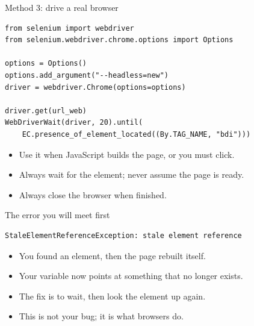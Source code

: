 \documentclass[11pt,aspectratio=169]{beamer}
\newenvironment{wideitemize}
  {\begin{itemize}\setlength{\itemsep}{10pt}}
  {\end{itemize}}
\begin{document}
\begin{frame}[fragile]{Method 3: drive a real browser}
\begin{lstlisting}[style=py]
from selenium import webdriver
from selenium.webdriver.chrome.options import Options

options = Options()
options.add_argument("--headless=new")
driver = webdriver.Chrome(options=options)

driver.get(url_web)
WebDriverWait(driver, 20).until(
    EC.presence_of_element_located((By.TAG_NAME, "bdi")))
\end{lstlisting}

\begin{wideitemize}
  \item Use it when JavaScript builds the page, or you must click.
  \item Always wait for the element; never assume the page is ready.
  \item Always close the browser when finished.
\end{wideitemize}
\end{frame}

\begin{frame}[fragile]{The error you will meet first}
\begin{lstlisting}[style=code]
StaleElementReferenceException: stale element reference
\end{lstlisting}

\begin{wideitemize}
  \item You found an element, then the page rebuilt itself.
  \item Your variable now points at something that no longer exists.
  \item The fix is to wait, then look the element up again.
  \item This is not your bug; it is what browsers do.
\end{wideitemize}
\end{frame}
\end{document}
